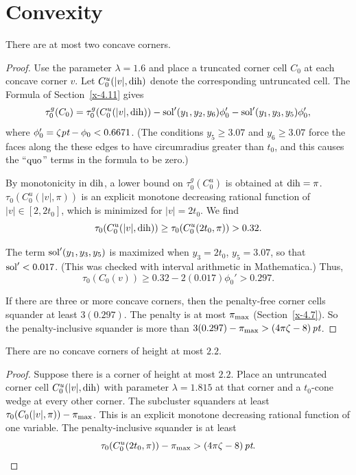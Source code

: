 \section{Convexity}

\begin{lemma}
There are at most two concave corners.
\end{lemma}


\begin{proof}
Use the parameter $\lambda=1.6$ and place a truncated corner cell $C_0$
at each concave corner $v$. Let $C_0^u(|v|,\operatorname{dih})$ denote the
corresponding untruncated cell. The Formula of Section~\ref{x-4.11}
gives
    $$
    \tau_0^g(C_0) =
    \tau^g_0(C^u_0(|v|,\operatorname{dih}))
    - \operatorname{sol}'(y_1,y_2,y_6) \phi'_0
    -\operatorname{sol}'(y_1,y_3,y_5)\phi'_0,
    $$
where $\phi'_0 = \zeta\hbox{\it pt}-\phi_0 < 0.6671$. (The conditions $y_5\ge3.07$
and $y_6\ge 3.07$ force the faces along the these edges to have
circumradius greater than $t_0$, and this causes the ``$\operatorname{quo}$'' terms in
the formula to be zero.)

By monotonicity in $\operatorname{dih}$, a lower bound on $\tau^g_0(C^u_0)$ is
obtained at $\operatorname{dih}=\pi$. $\tau_0(C^u_0(|v|,\pi))$ is an explicit monotone
decreasing rational function of $|v|\in[2,2t_0]$, which is minimized for
$|v|=2t_0$.  We find
    $$\tau_0(C_0^u(|v|,\operatorname{dih}))\ge\tau_0(C_0^u(2t_0,\pi)) >0.32.$$

The term $\operatorname{sol}'(y_1,y_3,y_5)$ is maximized when $y_3=2t_0$, $y_5=3.07$,
so that $\operatorname{sol}'< 0.017$.  (This was checked with interval arithmetic in
Mathematica.) Thus,
    $$\tau_0(C_0(v))\ge 0.32 - 2(0.017) \phi_0' > 0.297.$$

If there are three or more concave corners, then the penalty-free corner
cells squander at least $3(0.297)$. The penalty is at most $\pi_{\max}$
(Section~\ref{x-4.7}). So the penalty-inclusive squander is more than
    $3(0.297) - \pi_{\max} >(4\pi\zeta-8)\,\hbox{\it pt}$.
\end{proof}

\begin{lemma}
There are no concave corners of height at most $2.2$.
\end{lemma}

\begin{proof}
Suppose there is a corner of height at most $2.2$. Place an
untruncated corner cell $C^u_0(|v|,\operatorname{dih})$ with parameter $\lambda
=1.815$ at that corner and a $t_0$-cone wedge at every other corner. The
subcluster squanders at least
    $\tau_0(C_0(|v|,\pi))-\pi_{\max}$.
This is an explicit monotone decreasing rational function of one
variable. The penalty-inclusive squander is at least
    $$\tau_0(C^u_0(2t_0,\pi))-\pi_{\max} > (4\pi\zeta-8)\,\hbox{\it pt}.$$
\end{proof}

